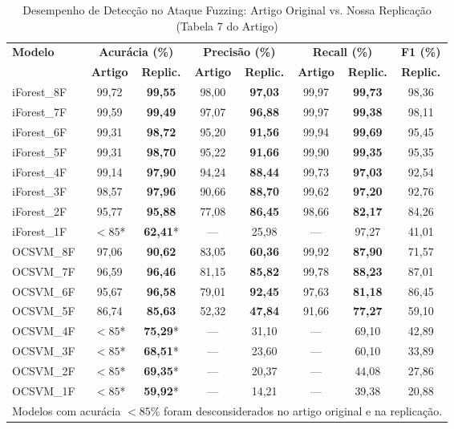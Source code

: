 \documentclass[conference]{IEEEtran}
\begin{document}
\begin{table}[htbp]
\caption{Desempenho de Detecção no Ataque Fuzzing: Artigo Original vs. Nossa Replicação (Tabela 7 do Artigo)}
\label{tab:table7_fuzzing}
\centering
\scriptsize
\setlength{\tabcolsep}{2.8pt}
\begin{tabular}{lccccccc}
\toprule
\multirow{2}{*}{\textbf{Modelo}} & \multicolumn{2}{c}{\textbf{Acurácia (\%)}} & \multicolumn{2}{c}{\textbf{Precisão (\%)}} & \multicolumn{2}{c}{\textbf{Recall (\%)}} & \textbf{F1 (\%)} \\
\cmidrule(lr){2-3} \cmidrule(lr){4-5} \cmidrule(lr){6-7} \cmidrule(lr){8-8}
 & \textbf{Artigo} & \textbf{Replic.} & \textbf{Artigo} & \textbf{Replic.} & \textbf{Artigo} & \textbf{Replic.} & \textbf{Replic.} \\
\midrule
iForest\_8F & 99,72 & \textbf{99,55} & 98,00 & \textbf{97,03} & 99,97 & \textbf{99,73} & 98,36 \\
iForest\_7F & 99,59 & \textbf{99,49} & 97,07 & \textbf{96,88} & 99,97 & \textbf{99,38} & 98,11 \\
iForest\_6F & 99,31 & \textbf{98,72} & 95,20 & \textbf{91,56} & 99,94 & \textbf{99,69} & 95,45 \\
iForest\_5F & 99,31 & \textbf{98,70} & 95,22 & \textbf{91,66} & 99,90 & \textbf{99,35} & 95,35 \\
iForest\_4F & 99,14 & \textbf{97,90} & 94,24 & \textbf{88,44} & 99,73 & \textbf{97,03} & 92,54 \\
iForest\_3F & 98,57 & \textbf{97,96} & 90,66 & \textbf{88,70} & 99,62 & \textbf{97,20} & 92,76 \\
iForest\_2F & 95,77 & \textbf{95,88} & 77,08 & \textbf{86,45} & 98,66 & \textbf{82,17} & 84,26 \\
iForest\_1F & $<85$* & \textbf{62,41}* & --- & 25,98 & --- & 97,27 & 41,01 \\
\midrule
OCSVM\_8F & 97,06 & \textbf{90,62} & 83,05 & \textbf{60,36} & 99,92 & \textbf{87,90} & 71,57 \\
OCSVM\_7F & 96,59 & \textbf{96,46} & 81,15 & \textbf{85,82} & 99,78 & \textbf{88,23} & 87,01 \\
OCSVM\_6F & 95,67 & \textbf{96,58} & 79,01 & \textbf{92,45} & 97,63 & \textbf{81,18} & 86,45 \\
OCSVM\_5F & 86,74 & \textbf{85,63} & 52,32 & \textbf{47,84} & 91,66 & \textbf{77,27} & 59,10 \\
OCSVM\_4F & $<85$* & \textbf{75,29}* & --- & 31,10 & --- & 69,10 & 42,89 \\
OCSVM\_3F & $<85$* & \textbf{68,51}* & --- & 23,60 & --- & 60,10 & 33,89 \\
OCSVM\_2F & $<85$* & \textbf{69,35}* & --- & 20,37 & --- & 44,08 & 27,86 \\
OCSVM\_1F & $<85$* & \textbf{59,92}* & --- & 14,21 & --- & 39,38 & 20,88 \\
\bottomrule
\multicolumn{8}{l}{\tiny *Modelos com acurácia $< 85\%$ foram desconsiderados no artigo original e na replicação.}
\end{tabular}
\end{table}
\end{document}
